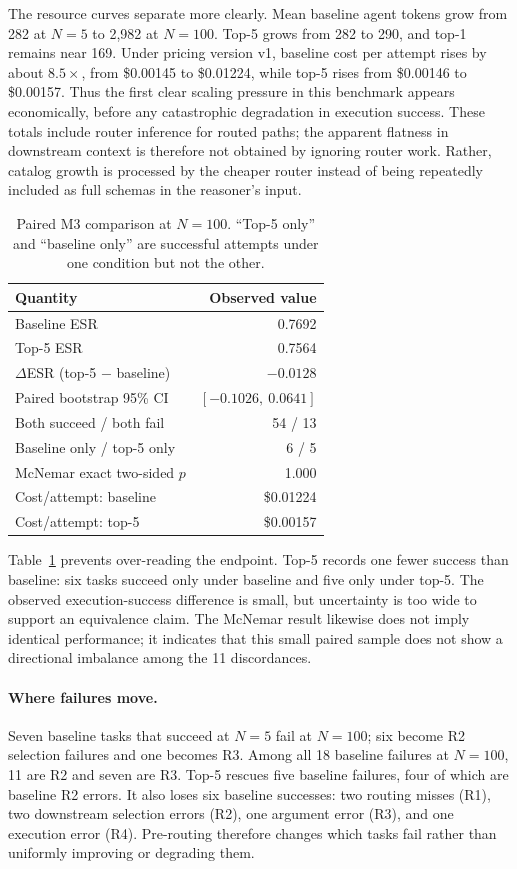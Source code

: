 \documentclass[10pt,twocolumn]{article}
\begin{document}
The resource curves separate more clearly. Mean baseline agent tokens grow from 282 at $N=5$ to 2,982 at $N=100$. Top-5 grows from 282 to 290, and top-1 remains near 169. Under pricing version v1, baseline cost per attempt rises by about $8.5\times$, from \$0.00145 to \$0.01224, while top-5 rises from \$0.00146 to \$0.00157. Thus the first clear scaling pressure in this benchmark appears economically, before any catastrophic degradation in execution success. These totals include router inference for routed paths; the apparent flatness in downstream context is therefore not obtained by ignoring router work. Rather, catalog growth is processed by the cheaper router instead of being repeatedly included as full schemas in the reasoner's input.

\begin{table}[t]
\centering
\caption{Paired M3 comparison at $N=100$. ``Top-5 only'' and ``baseline only'' are successful attempts under one condition but not the other.}
\label{tab:paired}
\small
\begin{tabular}{lr}
\toprule
Quantity & Observed value \\
\midrule
Baseline ESR & 0.7692 \\
Top-5 ESR & 0.7564 \\
$\Delta$ESR (top-5 $-$ baseline) & $-0.0128$ \\
Paired bootstrap 95\% CI & $[-0.1026,\ 0.0641]$ \\
Both succeed / both fail & 54 / 13 \\
Baseline only / top-5 only & 6 / 5 \\
McNemar exact two-sided $p$ & 1.000 \\
Cost/attempt: baseline & \$0.01224 \\
Cost/attempt: top-5 & \$0.00157 \\
\bottomrule
\end{tabular}
\end{table}

Table~\ref{tab:paired} prevents over-reading the endpoint. Top-5 records one fewer success than baseline: six tasks succeed only under baseline and five only under top-5. The observed execution-success difference is small, but uncertainty is too wide to support an equivalence claim. The McNemar result likewise does not imply identical performance; it indicates that this small paired sample does not show a directional imbalance among the 11 discordances.

\paragraph{Where failures move.}
Seven baseline tasks that succeed at $N=5$ fail at $N=100$; six become R2 selection failures and one becomes R3. Among all 18 baseline failures at $N=100$, 11 are R2 and seven are R3. Top-5 rescues five baseline failures, four of which are baseline R2 errors. It also loses six baseline successes: two routing misses (R1), two downstream selection errors (R2), one argument error (R3), and one execution error (R4). Pre-routing therefore changes which tasks fail rather than uniformly improving or degrading them.
\end{document}
